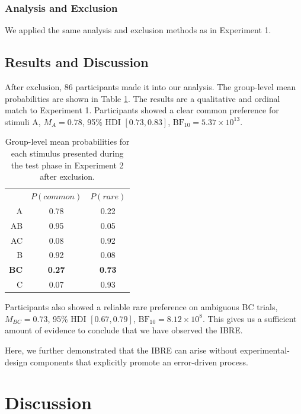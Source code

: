 \documentclass[10pt,letterpaper]{article}
\begin{document}
\subsubsection{Analysis and Exclusion}

We applied the same analysis and exclusion methods as in Experiment 1.

\subsection{Results and Discussion}

After exclusion, 86 participants made it into our analysis.
The group-level mean probabilities are shown in Table \ref{tab:results-exp2}.
The results are a qualitative and ordinal match to Experiment 1.
Participants showed a clear common preference for stimuli A, $M_{A} = 0.78$, 95\% HDI $[0.73, 0.83]$, $\mathrm{BF}_{10} = 5.37 \times 10^{13}$.

\begin{table}[H]
  \begin{center}
    \caption{Group-level mean probabilities for each stimulus presented during the test phase in Experiment 2 after exclusion.\\}
    \label{tab:results-exp2}
    \vskip 0.12in
    \begin{tabular}{rcc}
      \hline
       & $P(common)$ & $P(rare)$ \\
      A & 0.78 & 0.22\\
      AB & 0.95 & 0.05\\
      AC & 0.08 & 0.92\\
      B & 0.92 & 0.08\\
      \textbf{BC} & \textbf{0.27} & \textbf{0.73}\\
      C & 0.07 & 0.93\\
    \end{tabular}
  \end{center}
\end{table}

Participants also showed a reliable rare preference on ambiguous BC trials, $M_{BC} = 0.73$, 95\% HDI $[0.67, 0.79]$, $\mathrm{BF}_{10} = 8.12 \times 10^{8}$.
This gives us a sufficient amount of evidence to conclude that we have observed the IBRE.

Here, we further demonstrated that the IBRE can arise without experimental-design components that explicitly promote an error-driven process.

\section{Discussion}
\end{document}
